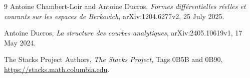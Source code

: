\documentclass[11pt]{article}
\begin{document}


\begin{sloppypar}
\raggedright
\begin{thebibliography}{9}
Antoine Chambert-Loir and Antoine Ducros,
\emph{Formes diff\'erentielles r\'eelles et courants sur les espaces de
Berkovich}, arXiv:1204.6277v2, 25 July 2025.

Antoine Ducros,
\emph{La structure des courbes analytiques},
arXiv:\allowbreak 2405.10619v1,
17 May 2024.

The Stacks Project Authors,
\emph{The Stacks Project}, Tags 0B5B and 0B90,
\url{https://stacks.math.columbia.edu}.
\end{thebibliography}
\end{sloppypar}
\end{document}
